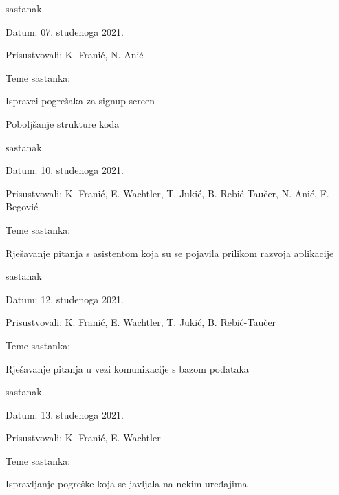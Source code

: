 \begin{packed_enum}
			\item  sastanak
			\item[] \begin{packed_item}
				\item Datum: 07. studenoga 2021.
				\item Prisustvovali: K. Franić, N. Anić
				\item Teme sastanka:
				\begin{packed_item}
					\item  Ispravci pogrešaka za signup screen
					\item  Poboljšanje strukture koda
				\end{packed_item}
			\end{packed_item}
		
			\item  sastanak
			\item[] \begin{packed_item}
				\item Datum: 10. studenoga 2021.
				\item Prisustvovali: K. Franić, E. Wachtler, T. Jukić, B. Rebić-Taučer, N. Anić, F. Begović
				\item Teme sastanka:
				\begin{packed_item}
					\item  Rješavanje pitanja s asistentom koja su se pojavila prilikom razvoja aplikacije
				\end{packed_item}
			\end{packed_item}
		
			\item  sastanak
			\item[] \begin{packed_item}
				\item Datum: 12. studenoga 2021.
				\item Prisustvovali: K. Franić, E. Wachtler, T. Jukić, B. Rebić-Taučer
				\item Teme sastanka:
				\begin{packed_item}
					\item  Rješavanje pitanja u vezi komunikacije s bazom podataka
				\end{packed_item}
			\end{packed_item}
		
			\item  sastanak
			\item[] \begin{packed_item}
				\item Datum: 13. studenoga 2021.
				\item Prisustvovali: K. Franić, E. Wachtler
				\item Teme sastanka:
				\begin{packed_item}
					\item  Ispravljanje pogreške koja se javljala na nekim uređajima
				\end{packed_item}
			\end{packed_item}
		

\end{packed_enum}
